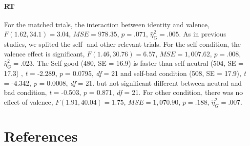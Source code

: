 \documentclass[man]{apa6}
\let\oldparagraph\paragraph
\renewcommand{\paragraph}[1]{\oldparagraph{#1}\mbox{}}
\begin{document}
\hypertarget{rt-1}{%
\paragraph{RT}\label{rt-1}}

For the matched trials, the interaction between identity and valence, \(F(1.62, 34.1) = 3.04\), \(\mathit{MSE} = 978.35\), \(p = .071\), \(\hat{\eta}^2_G = .005\). As in previous studies, we splited the self- and other-relevant trials. For the self condition, the valence effect is significant, \(F(1.46, 30.76) = 6.57\), \(\mathit{MSE} = 1,007.62\), \(p = .008\), \(\hat{\eta}^2_G = .023\). The Self-good (480, SE = 16.9) is faster than self-neutral (504, SE = 17.3) , \emph{t} = -2.289, \emph{p} = 0.0795, \emph{df} = 21 and self-bad condition (508, SE = 17.9), \emph{t} = -4.342, \emph{p} = 0.0008, \emph{df} = 21. but not significant different between neutral and bad condition, \emph{t} = -0.503, \emph{p} = 0.871, \emph{df} = 21. For other condition, there was no effect of valence, \(F(1.91, 40.04) = 1.75\), \(\mathit{MSE} = 1,070.90\), \(p = .188\), \(\hat{\eta}^2_G = .007\).

\newpage

\hypertarget{references}{%
\section{References}\label{references}}

\begingroup
\setlength{\parindent}{-0.5in}
\setlength{\leftskip}{0.5in}

\hypertarget{refs}{}

\endgroup
\end{document}
